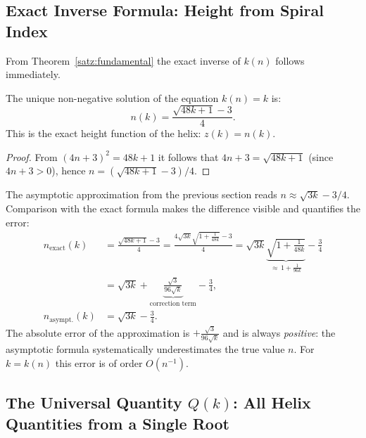 \subsection{Exact Inverse Formula: Height from Spiral Index}
\label{subsec:umkehrformel}

From Theorem~\ref{satz:fundamental} the exact inverse of $k(n)$
follows immediately.

\begin{satz}\label{satz:hoehenfunktion}
The unique non-negative solution of the equation $k(n) = k$ is:
\begin{equation}\label{eq:n_von_k}
  \boxed{n(k) = \frac{\sqrt{48k + 1} - 3}{4}.}
\end{equation}
This is the exact height function of the helix: $z(k) = n(k)$.
\end{satz}

\begin{proof}
From $(4n+3)^2 = 48k+1$ it follows that $4n+3 = \sqrt{48k+1}$ (since $4n+3 > 0$),
hence $n = (\sqrt{48k+1}-3)/4$.
\end{proof}

\begin{bemerkung}
\label{bem:vergleich}
The asymptotic approximation from the previous section reads
$n \approx \sqrt{3k} - 3/4$. Comparison with the exact formula
makes the difference visible and quantifies the error:
\begin{align*}
  n_{\mathrm{exact}}(k)
  &= \frac{\sqrt{48k+1}-3}{4}
   = \frac{4\sqrt{3k}\sqrt{1+\frac{1}{48k}}-3}{4}
   = \sqrt{3k}\underbrace{\sqrt{1+\frac{1}{48k}}}_{\approx\,1+\frac{1}{96k}}
     - \frac{3}{4} \\
  &= \sqrt{3k} + \underbrace{\frac{\sqrt{3}}{96\sqrt{k}}}_{\text{correction term}}
     - \frac{3}{4}, \\[6pt]
  n_{\mathrm{asympt.}}(k)
  &= \sqrt{3k} - \frac{3}{4}.
\end{align*}
The absolute error of the approximation is $+\tfrac{\sqrt{3}}{96\sqrt{k}}$
and is always \emph{positive}: the asymptotic formula systematically
underestimates the true value $n$. For $k = k(n)$ this error is of
order $O(n^{-1})$.
\end{bemerkung}

\subsection{The Universal Quantity \texorpdfstring{$Q(k)$}{Q(k)}: All Helix Quantities from a Single Root}
\label{subsec:Q}

